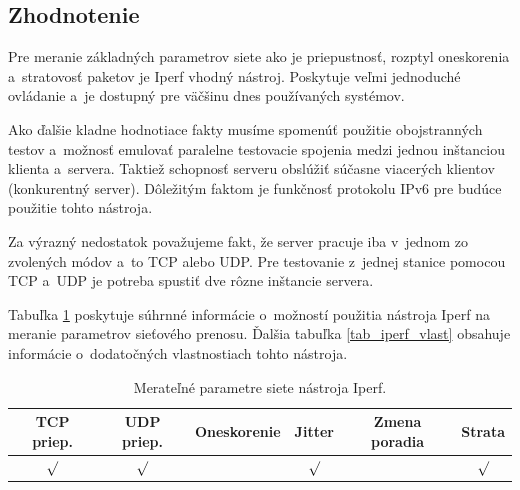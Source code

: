         \subsection{Zhodnotenie} \label{iperf_zhod}
        Pre meranie základných parametrov siete ako je priepustnosť, rozptyl 
        oneskorenia a~stratovosť paketov je Iperf vhodný nástroj. 
        Poskytuje veľmi jednoduché ovládanie a~je dostupný pre väčšinu dnes
        používaných systémov. 

        Ako ďalšie kladne hodnotiace fakty musíme spomenúť použitie obojstranných
        testov a~možnosť emulovať paralelne testovacie spojenia medzi jednou
        inštanciou klienta a~servera.
        Taktiež schopnosť serveru obslúžiť súčasne viacerých klientov 
        (konkurentný server). Dôležitým faktom je funkčnosť protokolu IPv6 pre 
        budúce použitie tohto nástroja.

        Za výrazný nedostatok považujeme fakt, že server pracuje iba v~jednom zo zvolených
        módov a~to TCP alebo UDP. Pre testovanie z~jednej stanice pomocou TCP
        a~UDP je potreba spustiť dve rôzne inštancie servera.

        Tabuľka \ref{tab_iperf_param} poskytuje súhrnné informácie o~možností
        použitia nástroja Iperf na meranie parametrov sieťového prenosu. Ďalšia
        tabuľka \ref{tab_iperf_vlast} obsahuje informácie o~dodatočných
        vlastnostiach tohto nástroja.

        \begin{table}[H]
            \begin{center}
                \begin{tabular}{|c|c|c|c|c|c|}
                    \hline
                    \textbf{TCP priep.}  &  \textbf{UDP priep.}  &
                    \textbf{Oneskorenie} & \textbf{Jitter} &
                    \textbf{Zmena poradia} & \textbf{Strata} \\
                    \hline
                    $\surd$ & $\surd$ &  & $\surd$ &  & $\surd$ \\ 
                    \hline
                \end{tabular}
                \caption{Merateľné parametre siete nástroja Iperf.}
                \label{tab_iperf_param}
            \end{center}
        \end{table}


